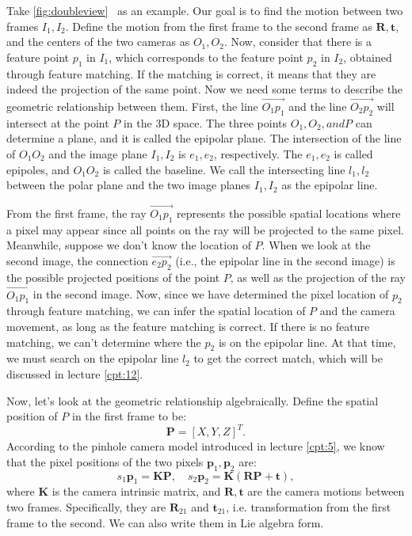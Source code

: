 Take \autoref{fig:doubleview}~ as an example. Our goal is to find the motion between two frames $I_{1}, I_{2}$. Define the motion from the first frame to the second frame as $\mathbf{R}, \mathbf{t}$, and the centers of the two cameras as $O_{1}, O_{2}$. Now, consider that there is a feature point $p_{1}$ in $I_{1}$, which corresponds to the feature point $p_{2}$ in $I_{2}$, obtained through feature matching. If the matching is correct, it means that they are indeed the projection of the same point. Now we need some terms to describe the geometric relationship between them. First, the line $\overrightarrow{O_{1}p_{1}}$ and the line $\overrightarrow{O_{2}p_{2}}$ will intersect at the point $P$ in the 3D space. The three points $O_{1}, O_{2}, and P$ can determine a plane, and it is called the epipolar plane. The intersection of the line of $O_{1}O_{2}$ and the image plane $I_{1}, I_{2}$ is $e_{1}, e_{2}$, respectively. The $e_{1}, e_{2}$ is called epipoles, and $O_{1}O_{2}$ is called the baseline. We call the intersecting line $l_{1},l_{2}$ between the polar plane and the two image planes $I_{1}, I_{2}$ as the epipolar line.

From the first frame, the ray $\overrightarrow{O_1 p_1}$ represents the possible spatial locations where a pixel may appear since all points on the ray will be projected to the same pixel. Meanwhile, suppose we don't know the location of $P$. When we look at the second image, the connection $\overrightarrow{e_2 p_2}$ (i.e., the epipolar line in the second image) is the possible projected positions of the point $P$, as well as the projection of the ray $\overrightarrow{O_1 p_1}$ in the second image. Now, since we have determined the pixel location of $p_2$ through feature matching, we can infer the spatial location of $P$ and the camera movement, as long as the feature matching is correct. If there is no feature matching, we can't determine where the $p_2$ is on the epipolar line. At that time, we must search on the epipolar line $l_2$ to get the correct match, which will be discussed in lecture \ref{cpt:12}.

Now, let's look at the geometric relationship algebraically. Define the spatial position of $P$ in the first frame to be:
\[
\mathbf{P}=[X,Y,Z]^T.
\]
According to the pinhole camera model introduced in lecture \ref{cpt:5}, we know that the pixel positions of the two pixels $\mathbf{p}_1,\mathbf{p}_2$ are:
\begin{equation}
\label{eq:7.1}
s_1 {\mathbf{p}_1} = \mathbf{KP},\quad s_2 \mathbf{p}_2 = \mathbf{K}\left( \mathbf{RP + t} \right),
\end{equation}
where $\mathbf{K}$ is the camera intrinsic  matrix, and $\mathbf{R}, \mathbf{t}$ are the camera motions between two frames. Specifically, they are $\mathbf{R}_{21}$ and $\mathbf{t}_{21}$, i.e. transformation from the first frame to the second. We can also write them in Lie algebra form.

